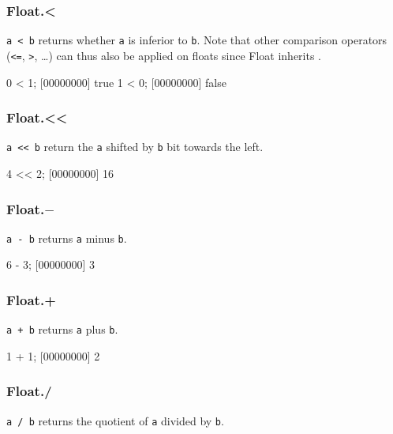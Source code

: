 \subsubsection{Float.\textless}

\lstinline|a < b| returns whether \lstinline|a| is inferior to
\lstinline|b|. Note that other comparison operators
(\lstinline|<=|, \lstinline|>|, \ldots) can thus also be applied on
floats since Float inherits .

\begin{urbiscript}
0 < 1;
[00000000] true
1 < 0;
[00000000] false
\end{urbiscript}

\subsubsection{Float.\textless\textless}

\lstinline|a << b| return the \lstinline|a| shifted by \lstinline|b|
bit towards the left.

\begin{urbiscript}
4 << 2;
[00000000] 16
\end{urbiscript}

\subsubsection{Float.$-$}

\lstinline|a - b| returns \lstinline|a| minus \lstinline|b|.

\begin{urbiscript}
6 - 3;
[00000000] 3
\end{urbiscript}

\subsubsection{Float.+}

\lstinline|a + b| returns \lstinline|a| plus \lstinline|b|.

\begin{urbiscript}
1 + 1;
[00000000] 2
\end{urbiscript}

\subsubsection{Float./}

\lstinline|a / b| returns the quotient of \lstinline|a| divided by
\lstinline|b|.

